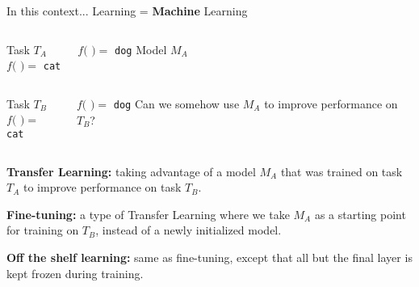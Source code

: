 \begin{frame}

\pause
{}
\begin{block}{In this context...}
Learning = \textbf{Machine} Learning
\end{block}

\pause
\begin{columns}[t]
\centering
Task $T_A$\\
\vspace{0.15cm}
$f($
$) =$ \texttt{cat}

$f($
$) =$ \texttt{dog}
\pause
\centering
Model $M_A$\\
\def\svgwidth{0.5\textwidth}

\end{columns}

\begin{columns}
\pause
\centering
Task $T_B$\\
\vspace{0.15cm}
$f($
$) =$ \texttt{cat}

$f($
$) =$ \texttt{dog}
\pause
\centering
Can we somehow use $M_A$ to improve performance on $T_B$?
\end{columns}

\end{frame}

\begin{frame}

\begin{definition}
\textbf{Transfer Learning:} {\footnotesize taking advantage of a model $M_A$ that was trained on task $T_A$ to improve performance on task $T_B$.}
\end{definition}

\pause
\begin{definition}
\textbf{Fine-tuning:} {\footnotesize a type of Transfer Learning where we take $M_A$ as a starting point for training on $T_B$, instead of a newly initialized model.}
\end{definition}

\pause
\begin{definition}
\textbf{Off the shelf learning:} {\footnotesize same as fine-tuning, except that all but the final layer is kept frozen during training.}
\end{definition}

\end{frame}

